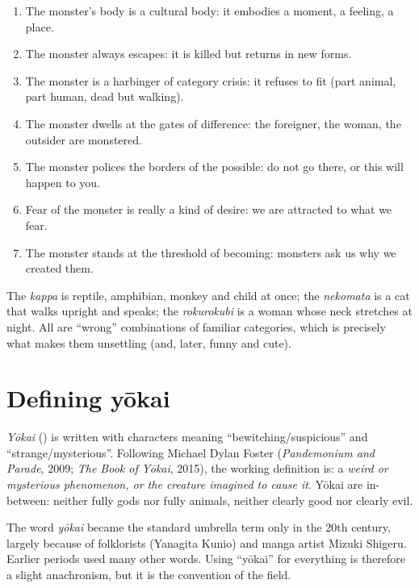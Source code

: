 \begin{enumerate}
  \item The monster's body is a cultural body: it embodies a moment, a feeling, a place.
  \item The monster always escapes: it is killed but returns in new forms.
  \item The monster is a harbinger of category crisis: it refuses to fit (part animal, part
        human, dead but walking).
  \item The monster dwells at the gates of difference: the foreigner, the woman, the
        outsider are monstered.
  \item The monster polices the borders of the possible: do not go there, or this will
        happen to you.
  \item Fear of the monster is really a kind of desire: we are attracted to what we fear.
  \item The monster stands at the threshold of becoming: monsters ask us why we created
        them.
\end{enumerate}

\begin{example}
The \emph{kappa} is reptile, amphibian, monkey and child at once; the \emph{nekomata} is a
cat that walks upright and speaks; the \emph{rokurokubi} is a woman whose neck stretches at
night. All are ``wrong'' combinations of familiar categories, which is precisely what makes
them unsettling (and, later, funny and cute).
\end{example}

\section{Defining yōkai}

\begin{definition}[Yōkai]
\emph{Yōkai} () is written with characters meaning ``bewitching/suspicious'' and
``strange/mysterious''. Following Michael Dylan Foster (\emph{Pandemonium and Parade},
2009; \emph{The Book of Yōkai}, 2015), the working definition is: a
\emph{weird or mysterious phenomenon, or the creature imagined to cause it}. Yōkai are
in-between: neither fully gods nor fully animals, neither clearly good nor clearly evil.
\end{definition}

\begin{remark}
The word \emph{yōkai} became the standard umbrella term only in the 20th century, largely
because of folklorists (Yanagita Kunio) and manga artist Mizuki Shigeru. Earlier periods
used many other words. Using ``yōkai'' for everything is therefore a slight anachronism,
but it is the convention of the field.
\end{remark}

